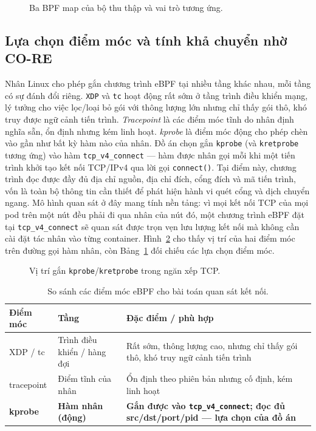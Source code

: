 \begin{figure}[H]
  \centering
  \resizebox{0.98\linewidth}{!}{}
  \caption{Ba BPF map của bộ thu thập và vai trò tương ứng.}
  \label{fig:bpf-maps}
\end{figure}

\subsection{Lựa chọn điểm móc và tính khả chuyển nhờ CO-RE}

Nhân Linux cho phép gắn chương trình eBPF tại nhiều tầng khác nhau, mỗi tầng có
sự đánh đổi riêng. \texttt{XDP} và \texttt{tc} hoạt động rất sớm ở tầng trình điều
khiển mạng, lý tưởng cho việc lọc/loại bỏ gói với thông lượng lớn nhưng chỉ thấy
gói thô, khó truy được ngữ cảnh tiến trình. \textit{Tracepoint} là các điểm móc
tĩnh do nhân định nghĩa sẵn, ổn định nhưng kém linh hoạt. \textit{kprobe} là điểm
móc động cho phép chèn vào gần như bất kỳ hàm nào của nhân. Đồ án chọn gắn
\texttt{kprobe} (và \texttt{kretprobe} tương ứng) vào hàm \texttt{tcp\_v4\_connect}
--- hàm được nhân gọi mỗi khi một tiến trình khởi tạo kết nối TCP/IPv4 qua lời gọi
\texttt{connect()}. Tại điểm này, chương trình đọc được đầy đủ địa chỉ nguồn,
địa chỉ đích, cổng đích và mã tiến trình, vốn là toàn bộ thông tin cần thiết để
phát hiện hành vi quét cổng và dịch chuyển ngang. Mô hình quan sát ở đây mang
tính nền tảng: vì mọi kết nối TCP của mọi pod trên một nút đều phải đi qua nhân
của nút đó, một chương trình eBPF đặt tại \texttt{tcp\_v4\_connect} sẽ quan sát
được trọn vẹn lưu lượng kết nối mà không cần cài đặt tác nhân vào từng container.
Hình~\ref{fig:kprobe-stack} cho thấy vị trí của hai điểm móc trên đường gọi hàm
nhân, còn Bảng~\ref{tab:hook-compare} đối chiếu các lựa chọn điểm móc.

\begin{figure}[H]
  \centering
  \resizebox{0.9\linewidth}{!}{}
  \caption{Vị trí gắn \texttt{kprobe}/\texttt{kretprobe} trong ngăn xếp TCP.}
  \label{fig:kprobe-stack}
\end{figure}

\begin{table}[H]
  \centering
  \caption{So sánh các điểm móc eBPF cho bài toán quan sát kết nối.}
  \label{tab:hook-compare}
  \small
  \begin{tabularx}{\linewidth}{@{}l l X@{}}
    \toprule
    \textbf{Điểm móc} & \textbf{Tầng} & \textbf{Đặc điểm / phù hợp} \\
    \midrule
    XDP / tc        & Trình điều khiển / hàng đợi & Rất sớm, thông lượng cao, nhưng chỉ thấy gói thô, khó truy ngữ cảnh tiến trình \\
    tracepoint      & Điểm tĩnh của nhân          & Ổn định theo phiên bản nhưng cố định, kém linh hoạt \\
    \textbf{kprobe} & \textbf{Hàm nhân (động)}    & \textbf{Gắn được vào \texttt{tcp\_v4\_connect}; đọc đủ src/dst/port/pid --- lựa chọn của đồ án} \\
    \bottomrule
  \end{tabularx}
\end{table}

